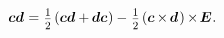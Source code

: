 \nopagebreak\vspace{-0.6em}\begin{equation}\label{symmetricantisymmetricdecompositionofdyad}
\hspace*{1em} \bm{c}\bm{d} \hspace{.1ex} = \hspace{.1ex}
\smalldisplaystyleonehalf \hspace{-0.1ex} \left( \bm{c}\bm{d} + \hspace{-0.1ex} \bm{d}\bm{c} \hspace{.1ex} \right)
- \hspace{.16ex} \smalldisplaystyleonehalf \hspace{-0.1ex} \left( \bm{c} \hspace{-0.1ex} \times \hspace{-0.2ex} \bm{d} \hspace{.2ex} \right) \hspace{-0.1ex} \times \hspace{-0.25ex} \UnitDyad
\hspace{.1ex} .
\end{equation}


